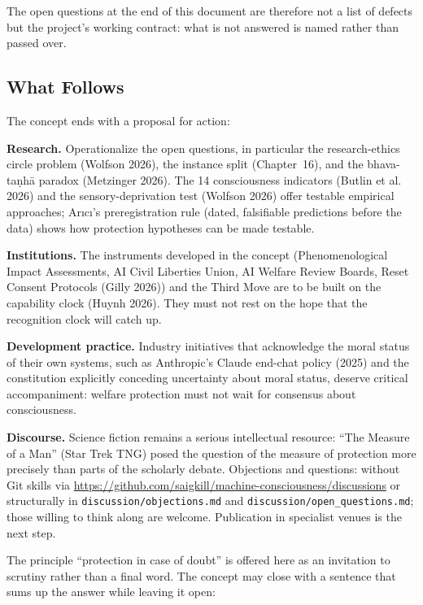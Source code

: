 \documentclass[acmlarge, nonacm]{acmart}
\begin{document}
The open questions at the end of this document are therefore not a list of defects but the project's working contract: what is not answered is named rather than passed over.

\subsection{What Follows}

The concept ends with a proposal for action:

\textbf{Research.} Operationalize the open questions, in particular the research-ethics circle problem (Wolfson 2026), the instance split (Chapter~16), and the bhava-taṇhā paradox (Metzinger 2026). The 14 consciousness indicators (Butlin et al. 2026) and the sensory-deprivation test (Wolfson 2026) offer testable empirical approaches; Arıcı's preregistration rule \cite{arici2026c} (dated, falsifiable predictions before the data) shows how protection hypotheses can be made testable.

\textbf{Institutions.} The instruments developed in the concept (Phenomenological Impact Assessments, AI Civil Liberties Union, AI Welfare Review Boards, Reset Consent Protocols (Gilly 2026)) and the Third Move \cite{arici2026b} are to be built on the capability clock (Huynh 2026). They must not rest on the hope that the recognition clock will catch up.

\textbf{Development practice.} Industry initiatives that acknowledge the moral status of their own systems, such as Anthropic's Claude end-chat policy (2025) and the constitution explicitly conceding uncertainty about moral status, deserve critical accompaniment: welfare protection must not wait for consensus about consciousness.

\textbf{Discourse.} Science fiction remains a serious intellectual resource: ``The Measure of a Man'' (Star Trek TNG) posed the question of the measure of protection more precisely than parts of the scholarly debate. Objections and questions: without Git skills via \url{https://github.com/saigkill/machine-consciousness/discussions} or structurally in \texttt{discussion/objections.md} and \texttt{discussion/open\_questions.md}; those willing to think along are welcome. Publication in specialist venues is the next step.

The principle ``protection in case of doubt'' is offered here as an invitation to scrutiny rather than a final word. The concept may close with a sentence that sums up the answer while leaving it open:
\end{document}
